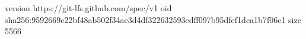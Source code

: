 version https://git-lfs.github.com/spec/v1
oid sha256:9592669c22bf48ab502f34ae3d4df322632593edff097b95dfef1dca1b7f06e1
size 5566
